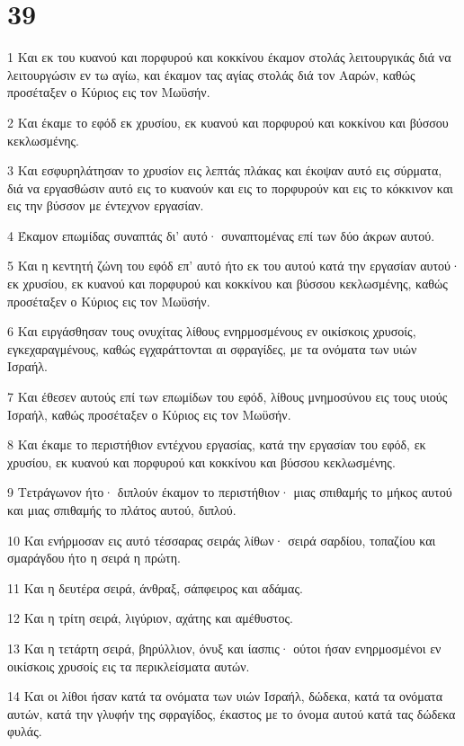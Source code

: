 \chapter{39}

\par 1 Και εκ του κυανού και πορφυρού και κοκκίνου έκαμον στολάς λειτουργικάς διά να λειτουργώσιν εν τω αγίω, και έκαμον τας αγίας στολάς διά τον Ααρών, καθώς προσέταξεν ο Κύριος εις τον Μωϋσήν.
\par 2 Και έκαμε το εφόδ εκ χρυσίου, εκ κυανού και πορφυρού και κοκκίνου και βύσσου κεκλωσμένης.
\par 3 Και εσφυρηλάτησαν το χρυσίον εις λεπτάς πλάκας και έκοψαν αυτό εις σύρματα, διά να εργασθώσιν αυτό εις το κυανούν και εις το πορφυρούν και εις το κόκκινον και εις την βύσσον με έντεχνον εργασίαν.
\par 4 Έκαμον επωμίδας συναπτάς δι' αυτό· συναπτομένας επί των δύο άκρων αυτού.
\par 5 Και η κεντητή ζώνη του εφόδ επ' αυτό ήτο εκ του αυτού κατά την εργασίαν αυτού· εκ χρυσίου, εκ κυανού και πορφυρού και κοκκίνου και βύσσου κεκλωσμένης, καθώς προσέταξεν ο Κύριος εις τον Μωϋσήν.
\par 6 Και ειργάσθησαν τους ονυχίτας λίθους ενηρμοσμένους εν οικίσκοις χρυσοίς, εγκεχαραγμένους, καθώς εγχαράττονται αι σφραγίδες, με τα ονόματα των υιών Ισραήλ.
\par 7 Και έθεσεν αυτούς επί των επωμίδων του εφόδ, λίθους μνημοσύνου εις τους υιούς Ισραήλ, καθώς προσέταξεν ο Κύριος εις τον Μωϋσήν.
\par 8 Και έκαμε το περιστήθιον εντέχνου εργασίας, κατά την εργασίαν του εφόδ, εκ χρυσίου, εκ κυανού και πορφυρού και κοκκίνου και βύσσου κεκλωσμένης.
\par 9 Τετράγωνον ήτο· διπλούν έκαμον το περιστήθιον· μιας σπιθαμής το μήκος αυτού και μιας σπιθαμής το πλάτος αυτού, διπλού.
\par 10 Και ενήρμοσαν εις αυτό τέσσαρας σειράς λίθων· σειρά σαρδίου, τοπαζίου και σμαράγδου ήτο η σειρά η πρώτη.
\par 11 Και η δευτέρα σειρά, άνθραξ, σάπφειρος και αδάμας.
\par 12 Και η τρίτη σειρά, λιγύριον, αχάτης και αμέθυστος.
\par 13 Και η τετάρτη σειρά, βηρύλλιον, όνυξ και ίασπις· ούτοι ήσαν ενηρμοσμένοι εν οικίσκοις χρυσοίς εις τα περικλείσματα αυτών.
\par 14 Και οι λίθοι ήσαν κατά τα ονόματα των υιών Ισραήλ, δώδεκα, κατά τα ονόματα αυτών, κατά την γλυφήν της σφραγίδος, έκαστος με το όνομα αυτού κατά τας δώδεκα φυλάς.
